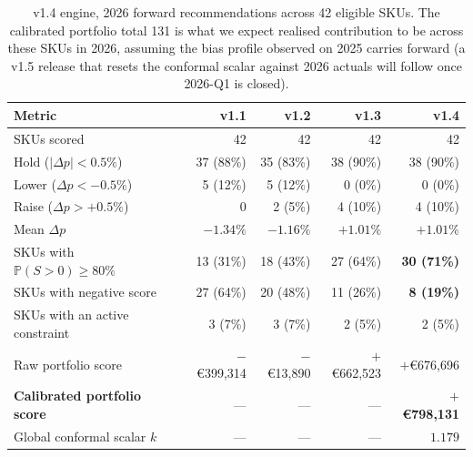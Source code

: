 \documentclass[11pt,a4paper]{article}
\newcommand{\Prob}{\mathbb{P}}
\begin{document}
\begin{table}[ht]
\centering
\small
\caption{v1.4 engine, 2026 forward recommendations across 42 eligible SKUs. The calibrated portfolio total 131 is what we expect realised contribution to be across these SKUs in 2026, assuming the bias profile observed on 2025 carries forward (a v1.5 release that resets the conformal scalar against 2026 actuals will follow once 2026-Q1 is closed).}
\label{tab:v1forward}
\begin{tabular}{@{}lrrrr@{}}
\toprule
\textbf{Metric} & \textbf{v1.1} & \textbf{v1.2} & \textbf{v1.3} & \textbf{v1.4} \\
\midrule
SKUs scored                                       & 42                & 42                 & 42                & 42 \\
Hold ($|\Delta p|<0.5\%$)                         & 37 (88\%)          & 35 (83\%)         & 38 (90\%)         & 38 (90\%) \\
Lower ($\Delta p<-0.5\%$)                         & 5 (12\%)           & 5 (12\%)          & 0 (0\%)           & 0 (0\%) \\
Raise ($\Delta p>+0.5\%$)                         & 0                  & 2 (5\%)           & 4 (10\%)          & 4 (10\%) \\
Mean $\Delta p$                                   & $-1.34\%$          & $-1.16\%$         & $+1.01\%$         & $+1.01\%$ \\
SKUs with $\Prob(S>0)\geq 80\%$                   & 13 (31\%)          & 18 (43\%)         & 27 (64\%)         & \textbf{30 (71\%)} \\
SKUs with negative score                          & 27 (64\%)          & 20 (48\%)         & 11 (26\%)         & \textbf{8 (19\%)} \\
SKUs with an active constraint                    & 3 (7\%)            & 3 (7\%)           & 2 (5\%)           & 2 (5\%) \\
Raw portfolio score                               & $-$€399{,}314      & $-$€13{,}890      & $+$€662{,}523     & $+$€676{,}696 \\
\textbf{Calibrated portfolio score}              & ---                & ---               & ---               & \textbf{$+$€798{,}131} \\
Global conformal scalar $k$                       & ---                & ---               & ---               & $1.179$ \\
\bottomrule
\end{tabular}
\end{table}
\end{document}

